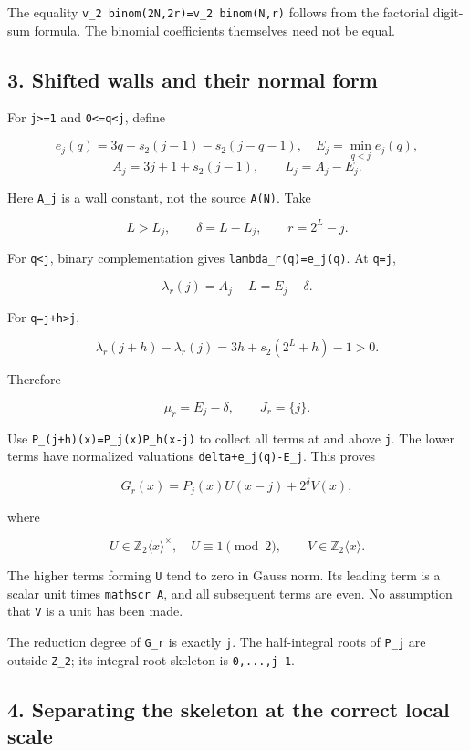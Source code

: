 \documentclass[11pt,letterpaper]{article}
\begin{document}
The equality \texttt{v\_2\ binom(2N,2r)=v\_2\ binom(N,r)} follows from the factorial digit-sum formula. The binomial coefficients themselves need not be equal.

\subsection{3. Shifted walls and their normal form}\label{shifted-walls-and-their-normal-form}

For \texttt{j\textgreater{}=1} and \texttt{0\textless{}=q\textless{}j}, define

\[
e_j(q)=3q+s_2(j-1)-s_2(j-q-1),\quad
E_j=\min_{q<j}e_j(q),
\] \[
A_j=3j+1+s_2(j-1),\qquad L_j=A_j-E_j.
\]

Here \texttt{A\_j} is a wall constant, not the source \texttt{A(N)}. Take

\[
L>L_j,\qquad \delta=L-L_j,\qquad r=2^L-j.
\]

For \texttt{q\textless{}j}, binary complementation gives \texttt{lambda\_r(q)=e\_j(q)}. At \texttt{q=j},

\[
\lambda_r(j)=A_j-L=E_j-\delta.
\]

For \texttt{q=j+h\textgreater{}j},

\[
\lambda_r(j+h)-\lambda_r(j)
=3h+s_2(2^L+h)-1>0.
\]

Therefore

\[
\mu_r=E_j-\delta,\qquad J_r=\{j\}. \tag{3.1}
\]

Use \texttt{P\_(j+h)(x)=P\_j(x)P\_h(x-j)} to collect all terms at and above \texttt{j}. The lower terms have normalized valuations \texttt{delta+e\_j(q)-E\_j}. This proves

\[
\boxed{G_r(x)=P_j(x)U(x-j)+2^\delta V(x),} \tag{3.2}
\]

where

\[
U\in\mathbb Z_2\langle x\rangle^\times,\quad U\equiv1\pmod2,
\qquad V\in\mathbb Z_2\langle x\rangle.
\]

The higher terms forming \texttt{U} tend to zero in Gauss norm. Its leading term is a scalar unit times \texttt{mathscr\ A}, and all subsequent terms are even. No assumption that \texttt{V} is a unit has been made.

The reduction degree of \texttt{G\_r} is exactly \texttt{j}. The half-integral roots of \texttt{P\_j} are outside \texttt{Z\_2}; its integral root skeleton is \texttt{0,...,j-1}.

\subsection{4. Separating the skeleton at the correct local scale}\label{separating-the-skeleton-at-the-correct-local-scale}
\end{document}
